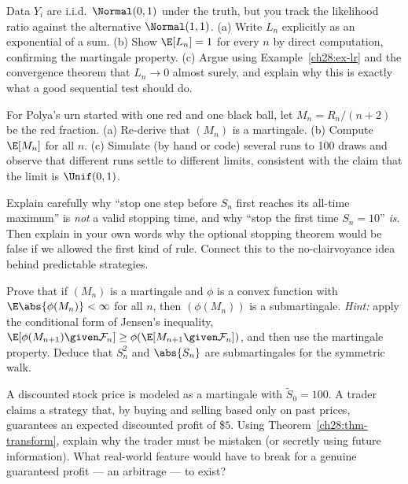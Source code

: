 \begin{exercise}
\label{ch28:exer-lr}
Data $Y_i$ are i.i.d.\ $\Normal(0,1)$ under the truth, but you track the likelihood ratio against the
alternative $\Normal(1,1)$. (a) Write $L_n$ explicitly as an exponential of a sum. (b) Show
$\E[L_n] = 1$ for every $n$ by direct computation, confirming the martingale property. (c) Argue using
Example~\ref{ch28:ex-lr} and the convergence theorem that $L_n \to 0$ almost surely, and explain why
this is exactly what a good sequential test should do.
\end{exercise}

\begin{exercise}
\label{ch28:exer-polya}
For Polya's urn started with one red and one black ball, let $M_n = R_n/(n+2)$ be the red fraction.
(a) Re-derive that $(M_n)$ is a martingale. (b) Compute $\E[M_n]$ for all $n$. (c) Simulate (by hand or
code) several runs to 100 draws and observe that different runs settle to different limits, consistent
with the claim that the limit is $\Unif(0,1)$.
\end{exercise}

\begin{exercise}
\label{ch28:exer-stopping}
Explain carefully why ``stop one step before $S_n$ first reaches its all-time maximum'' is \emph{not} a
valid stopping time, and why ``stop the first time $S_n = 10$'' \emph{is}. Then explain in your own
words why the optional stopping theorem would be false if we allowed the first kind of rule. Connect
this to the no-clairvoyance idea behind predictable strategies.
\end{exercise}

\begin{exercise}
\label{ch28:exer-proof}
Prove that if $(M_n)$ is a martingale and $\phi$ is a convex function with $\E\abs{\phi(M_n)} < \infty$
for all $n$, then $(\phi(M_n))$ is a submartingale. \emph{Hint:} apply the conditional form of Jensen's
inequality, $\E[\phi(M_{n+1})\given\mathcal{F}_n] \ge \phi(\E[M_{n+1}\given\mathcal{F}_n])$, and then
use the martingale property. Deduce that $S_n^2$ and $\abs{S_n}$ are submartingales for the symmetric
walk.
\end{exercise}

\begin{exercise}
\label{ch28:exer-finance}
A discounted stock price is modeled as a martingale with $\tilde{S}_0 = 100$. A trader claims a
strategy that, by buying and selling based only on past prices, guarantees an expected discounted
profit of \$$5$. Using Theorem~\ref{ch28:thm-transform}, explain why the trader must be mistaken (or
secretly using future information). What real-world feature would have to break for a genuine guaranteed
profit --- an arbitrage --- to exist?
\end{exercise}
